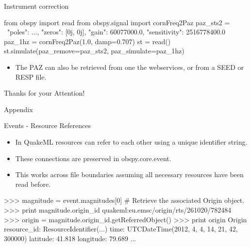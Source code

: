 \documentclass[handout]{beamer}
\begin{document}
\begin{frame}{Instrument correction}

\begin{myColorBox}{0.95}{}
\begin{python}
from obspy import read
from obspy.signal import cornFreq2Paz
paz_sts2 = {\
    "poles": ...,
    "zeros": [0j, 0j],
    "gain": 60077000.0,
    "sensitivity": 2516778400.0}
paz_1hz = cornFreq2Paz(1.0, damp=0.707)
st = read()
st.simulate(paz_remove=paz_sts2, paz_simulate=paz_1hz)
\end{python}
\end{myColorBox}

\begin{itemize}
    \item The PAZ can also be retrieved from one the webservices, or from a SEED or RESP file.
\end{itemize}

\end{frame}


\begin{frame}[plain, fragile]{}
    \begin{center}
        \textcolor{lmu@darkgreen}{\LARGE{Thanks for your Attention!}}
    \end{center}
\end{frame}


\begin{frame}{}
    \begin{center}
        \textcolor{lmu@darkgreen}{\LARGE{Appendix}}
    \end{center}
\end{frame}

\begin{frame}{Events - Resource References}
    \begin{itemize}
        \item In QuakeML resources can refer to each other using a unique identifier string.
        \item These connections are preserved in obspy.core.event.
        \item This works across file boundaries assuming all necessary resources have been read before.
    \end{itemize}
\begin{myColorBox}{0.95}{}
\begin{python}
>>> magnitude = event.magnitudes[0]
# Retrieve the associated Origin object.
>>> print magnitude.origin_id
quakeml:eu.emsc/origin/rts/261020/782484
>>> origin = magnitude.origin_id.getReferredObject()
>>> print origin
Origin
  resource_id: ResourceIdentifier(...)
         time: UTCDateTime(2012, 4, 4, 14, 21, 42, 300000)
     latitude: 41.818
    longitude: 79.689
    ...
\end{python}
\end{myColorBox}
\end{frame}
\end{document}
